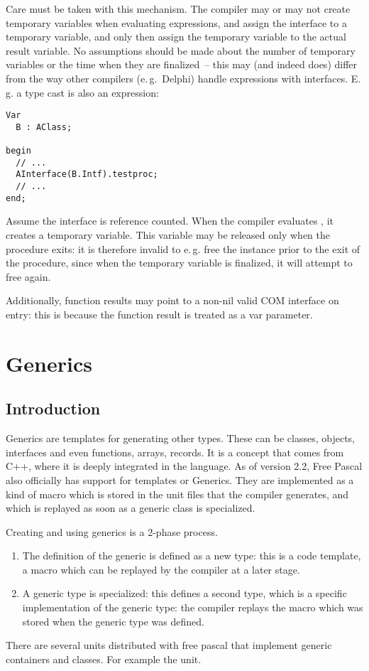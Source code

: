 Care must be taken with this mechanism. The compiler may or may not create
temporary variables when evaluating expressions, and assign the interface
to a temporary variable, and only then assign the temporary variable to
the actual result variable. No assumptions should be made about the number
of temporary variables or the time when they are finalized~-- this may
(and indeed does) differ from the way other compilers (e.\,g.\ Delphi) handle
expressions with interfaces. E.\,g. a type cast is also an expression:
\begin{verbatim}
Var
  B : AClass;

begin
  // ...
  AInterface(B.Intf).testproc;
  // ...
end;
\end{verbatim}
Assume the interface  is reference counted. When the compiler
evaluates , it creates a temporary variable. This variable may be
released only when the procedure exits: it is therefore invalid to e.\,g.
free the instance  prior to the exit of the procedure, since when the
temporary variable is finalized, it will attempt to free  again.

Additionally, function results may point to a non-nil valid COM interface on
entry: this is because the function result is treated as a var parameter.

\chapter{Generics}
\label{ch:generics}
\section{Introduction}
\label{se:genericsintroduction}
Generics are templates for generating other types. These can be classes, objects, interfaces and even functions, arrays, records.
It is a concept that comes from C++, where it is deeply integrated in the language.
As of version 2.2, Free Pascal also officially has support for templates or Generics.
They are implemented as a kind of macro which is stored in the unit files that the compiler generates,
and which is replayed as soon as a generic class is specialized.

Creating and using generics is a 2-phase process.
\begin{enumerate}
\item The definition of the generic is defined as a new type:
this is a code template, a macro which can be replayed by the compiler
at a later stage.
\item A generic type is specialized: this defines a second type,
which is a specific implementation of the generic type: the compiler
replays the macro which was stored when the generic type was defined.
\end{enumerate}
There are several units distributed with free pascal that implement generic
containers and classes. For example the  unit.

